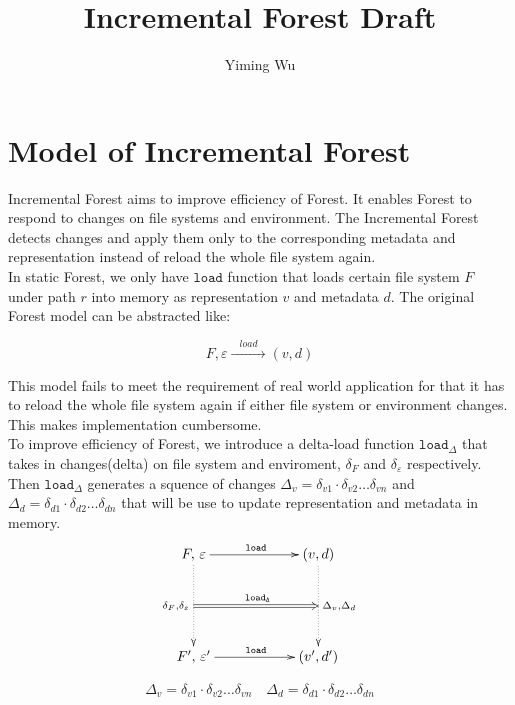 \documentclass[10pt,twoside,a4paper]{article}
\title{Incremental Forest Draft}
\author{Yiming Wu}
\theoremstyle{theorem}
\theoremstyle{lemma}
\theoremstyle{property}
\theoremstyle{definition}
\theoremstyle{assumption}
\begin{document}
\maketitle

\section{Model of Incremental Forest}

Incremental Forest aims to improve efficiency of Forest. It enables Forest to respond to changes on file systems and environment. 
The Incremental Forest detects changes and apply them only to the corresponding metadata and representation instead of reload the whole file system again. \\

In static Forest, we only have $\mathtt{load}$ function that loads certain file system $F$ under path $r$ into memory as representation $v$ and metadata $d$. The original Forest model can be abstracted like:

\begin{displaymath}
	F,\varepsilon \xrightarrow{\;\;\;load\;\;\;} (v,d) 
\end{displaymath}

This model fails to meet the requirement of real world application for that it has to reload the whole file system again if either file system or environment changes. This makes implementation cumbersome.\\

To improve efficiency of Forest, we introduce a delta-load function $\mathtt{load}_\Delta$ that takes in changes(delta) on file system and enviroment, $\delta_F$ and $\delta_\varepsilon$ respectively. Then $\mathtt{load}_\Delta$ generates a squence of changes $\Delta_v = \delta_{v1} \cdot \delta_{v2} \dots \delta_{vn}$ and $\Delta_d = \delta_{d1} \cdot \delta_{d2} \dots \delta_{dn}$ that will be use to update representation and metadata in memory.
\begin{displaymath}
	\xymatrix@=2cm{
	F,\, \varepsilon \ar@{->}[r]^{\mathtt{load}}
	\ar@{..>}[d]_{\delta_F, \delta_\varepsilon}="a"
	& (v,d)\ar@{..>}[d]^{\Delta_v, \Delta_d}="b"\\
	F',\, \varepsilon' \ar@{->}[r]^{\mathtt{load}}
	& (v',d')
	\ar@{=>}^{\mathtt{load_\Delta}}"a";"b"
	}
\end{displaymath}

\begin{displaymath}
\Delta_v = \delta_{v1} \cdot \delta_{v2} \dots \delta_{vn}	\quad 	\Delta_d = \delta_{d1} \cdot \delta_{d2} \dots \delta_{dn}
\end{displaymath}
\end{document}
